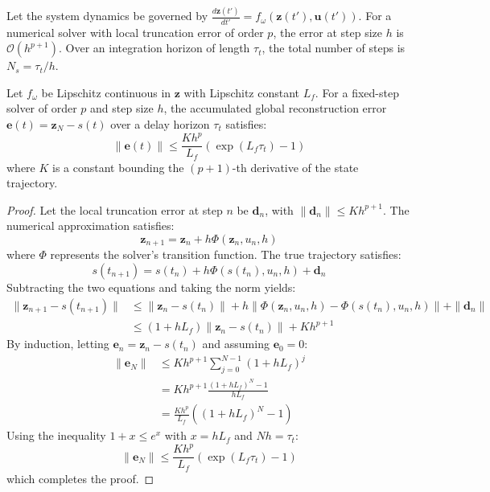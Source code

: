\documentclass[manuscript, screen, review]{jair}
\begin{document}
Let the system dynamics be governed by $\frac{d\mathbf{z}(t')}{dt'} = f_\omega(\mathbf{z}(t'), \mathbf{u}(t'))$. For a numerical solver with local truncation error of order $p$, the error at step size $h$ is $\mathcal{O}(h^{p+1})$. Over an integration horizon of length $\tau_t$, the total number of steps is $N_s = \tau_t / h$.

\begin{theorem}
Let $f_\omega$ be Lipschitz continuous in $\mathbf{z}$ with Lipschitz constant $L_f$. For a fixed-step solver of order $p$ and step size $h$, the accumulated global reconstruction error $\mathbf{e}(t) = \mathbf{z}_N - s(t)$ over a delay horizon $\tau_t$ satisfies:
\begin{equation}
    \| \mathbf{e}(t) \| \le \frac{K h^p}{L_f} \left( \exp\left( L_f \tau_t \right) - 1 \right)
\end{equation}
where $K$ is a constant bounding the $(p+1)$-th derivative of the state trajectory.
\end{theorem}

\begin{proof}
Let the local truncation error at step $n$ be $\mathbf{d}_n$, with $\|\mathbf{d}_n\| \le K h^{p+1}$. The numerical approximation satisfies:
\begin{equation*}
    \mathbf{z}_{n+1} = \mathbf{z}_n + h \Phi(\mathbf{z}_n, u_n, h)
\end{equation*}
where $\Phi$ represents the solver's transition function. The true trajectory satisfies:
\begin{equation*}
    s(t_{n+1}) = s(t_n) + h \Phi(s(t_n), u_n, h) + \mathbf{d}_n
\end{equation*}
Subtracting the two equations and taking the norm yields:
\begin{align*}
    \| \mathbf{z}_{n+1} - s(t_{n+1}) \| &\le \| \mathbf{z}_n - s(t_n) \| + h \| \Phi(\mathbf{z}_n, u_n, h) - \Phi(s(t_n), u_n, h) \| + \| \mathbf{d}_n \| \\
    &\le (1 + h L_f) \| \mathbf{z}_n - s(t_n) \| + K h^{p+1}
\end{align*}
By induction, letting $\mathbf{e}_n = \mathbf{z}_n - s(t_n)$ and assuming $\mathbf{e}_0 = 0$:
\begin{align*}
    \| \mathbf{e}_N \| &\le K h^{p+1} \sum_{j=0}^{N-1} (1 + h L_f)^j \\
    &= K h^{p+1} \frac{(1 + h L_f)^N - 1}{h L_f} \\
    &= \frac{K h^p}{L_f} \left( (1 + h L_f)^N - 1 \right)
\end{align*}
Using the inequality $1 + x \le e^x$ with $x = h L_f$ and $N h = \tau_t$:
\begin{equation*}
    \| \mathbf{e}_N \| \le \frac{K h^p}{L_f} \left( \exp\left( L_f \tau_t \right) - 1 \right)
\end{equation*}
which completes the proof.
\end{proof}
\end{document}
